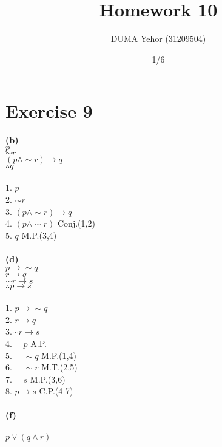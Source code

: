\documentclass{article}
\title{Homework 10}
\author{DUMA Yehor (31209504)}
\date{1/6}
\begin{document}
\maketitle
\section{Exercise 9}

\textbf{(b)} \\
$p$ \\
$\sim r$ \\
\underline{$(p \wedge \sim r) \rightarrow q$} \\
$\therefore q$ \\ \\ 
1. $p$ \\
2. $\sim r$ \\
3. $(p \wedge \sim r) \rightarrow q$ \\
4. $(p \wedge \sim r)$ \hspace*{\fill} Conj.(1,2) \\
5. $q$ \hspace*{\fill} M.P.(3,4) \\ \\
\textbf{(d)} \\
$p \rightarrow \sim q$ \\
$r \rightarrow q$ \\
\underline{$\sim r \rightarrow s$} \\
$\therefore p \rightarrow s$ \\ \\
1. $p \rightarrow \sim q$ \\
2. $r \rightarrow q$ \\
3.$\sim r \rightarrow s$ \\
4. $\quad p$ \hspace*{\fill} A.P. \\ 
5. $\quad \sim q$ \hspace*{\fill} M.P.(1,4) \\ 
6. $\quad \sim r$ \hspace*{\fill} M.T.(2,5) \\ 
7. $\quad s$ \hspace*{\fill} M.P.(3,6) \\ 
8. $p \rightarrow s$ \hspace*{\fill} C.P.(4-7) \\ \\
\textbf{(f)} \\ \\
$p \vee (q \wedge r)$ \\
\end{document}
